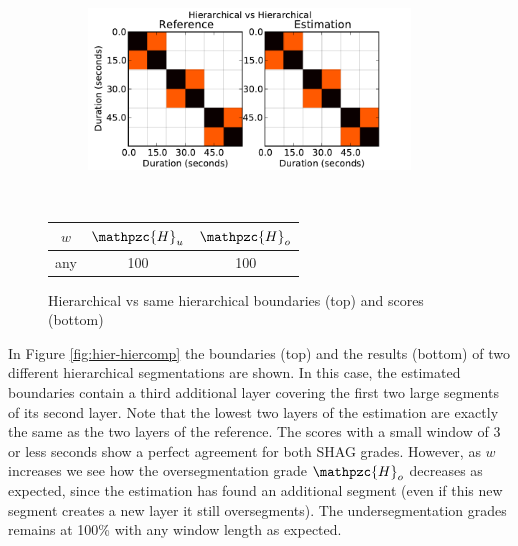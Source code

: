 \documentclass{article}
\begin{document}
\begin{figure}
  \centering
  \begin{subfigure}{0.5\textwidth}
    \centering
    \includegraphics[width=0.94\textwidth]{plots/hier-hier.pdf}
  \end{subfigure}%
  \\
  \begin{minipage}{0.5\textwidth}
    \centering
    \vspace{10pt}
    \begin{tabular}{|c|c|c|}
      \hline
      $w$       & $\mathpzc{H}_u$    & $\mathpzc{H}_o$      \\
      \hline
      any       & 100       & 100      \\     
      \hline
    \end{tabular}
  \end{minipage}
  \caption{Hierarchical vs same hierarchical boundaries (top) and scores (bottom)}
  \label{fig:hier-hier}
\end{figure}

In Figure \ref{fig:hier-hiercomp} the boundaries (top) and the results (bottom) of two different hierarchical segmentations are shown.
In this case, the estimated boundaries contain a third additional layer covering the first two large segments of its second layer.
Note that the lowest two layers of the estimation are exactly the same as the two layers of the reference.
The scores with a small window of 3 or less seconds show a perfect agreement for both SHAG grades.
However, as $w$ increases we see how the oversegmentation grade $\mathpzc{H}_o$ decreases as expected, since the estimation has found an additional segment (even if this new segment creates a new layer it still oversegments).
The undersegmentation grades remains at 100\% with any window length as expected.
\end{document}
